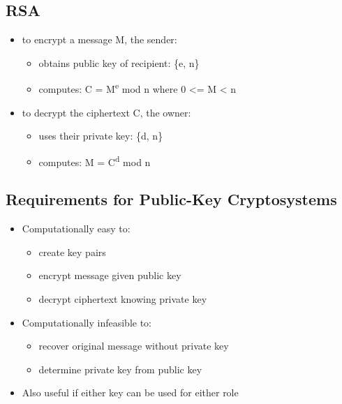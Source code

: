 \documentclass[11pt]{article}
\begin{document}
\subsection{RSA}
\label{sec:org199b041}
\begin{itemize}
\item to encrypt a message M, the sender:
\begin{itemize}
\item obtains public key of recipient: \{e, n\}
\item computes: C = M\textsuperscript{e} mod n where 0 <= M < n
\end{itemize}
\item to decrypt the ciphertext C, the owner:
\begin{itemize}
\item uses their private key: \{d, n\}
\item computes: M = C\textsuperscript{d} mod n
\end{itemize}
\end{itemize}
\subsection{Requirements for Public-Key Cryptosystems}
\label{sec:org344598f}
\begin{itemize}
\item Computationally easy to:
\begin{itemize}
\item create key pairs
\item encrypt message given public key
\item decrypt ciphertext knowing private key
\end{itemize}
\item Computationally infeasible to:
\begin{itemize}
\item recover original message without private key
\item determine private key from public key
\end{itemize}
\item Also useful if either key can be used for either role
\end{itemize}
\end{document}
